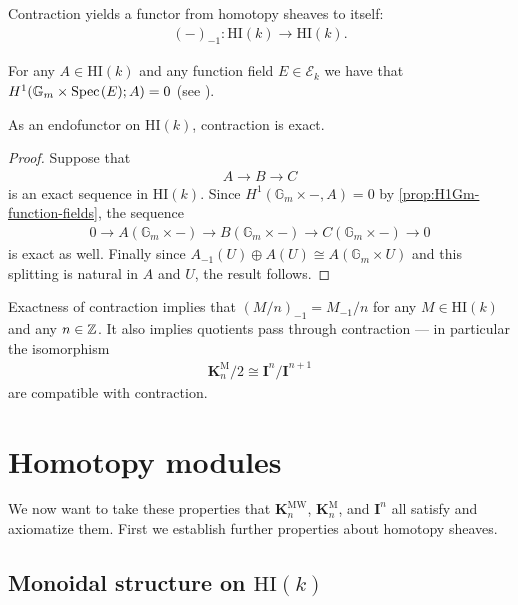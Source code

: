 \documentclass[11pt,openany]{book}
\providecommand{\HI}{\mathrm{HI}}
\providecommand{\KM}{\mathbf{K}^\mathrm{M}}
\providecommand{\KMW}{\mathbf{K}^\mathrm{MW}}
\begin{document}
Contraction yields a functor from homotopy sheaves to itself:
\begin{align*}
    (-)_{-1} \colon \HI(k) \to \HI(k).
\end{align*}
%
\begin{proposition}\label{prop:H1Gm-function-fields} 
For any $A \in \HI(k)$ and any function field $E \in \mathcal{E}_k$ we have that $H^1( \mathbb{G}_m \times \text{Spec}\hspace{0.1em}(E);A) = 0$  (see \cite[4.10]{Deglise-finite-corr}).
\end{proposition}

\begin{proposition} As an endofunctor on $\HI(k)$, contraction is exact.
\end{proposition}
\begin{proof} Suppose that
\begin{align*}
    A \to B \to C
\end{align*}
is an exact sequence in $\HI(k)$. Since $H^1(\mathbb{G}_m \times -, A) = 0$ by \autoref{prop:H1Gm-function-fields}, the sequence
\begin{align*}
    0 \to A(\mathbb{G}_m \times -) \to B(\mathbb{G}_m \times -) \to C(\mathbb{G}_m \times -) \to 0
\end{align*}
is exact as well. Finally since $A_{-1}(U) \oplus A(U) \cong A(\mathbb{G}_m \times U)$ and this splitting is natural in $A$ and $U$, the result follows.
\end{proof}

\begin{corollary} Exactness of contraction implies that $(M/n)_{-1} = M_{-1}/n$ for any $M \in \HI(k)$ and any $n \in \mathbb{Z}$. It also implies quotients pass through contraction --- in particular the isomorphism
\begin{align*}
    \KM_n/2 \cong \mathbf{I}^n/\mathbf{I}^{n+1}
\end{align*}
are compatible with contraction.
\end{corollary}


\section{Homotopy modules}

We now want to take these properties that $\KMW_n$, $\KM_n$, and $\mathbf{I}^n$ all satisfy and axiomatize them. First we establish further properties about homotopy sheaves.

\subsection{Monoidal structure on $\HI(k)$}
\end{document}
